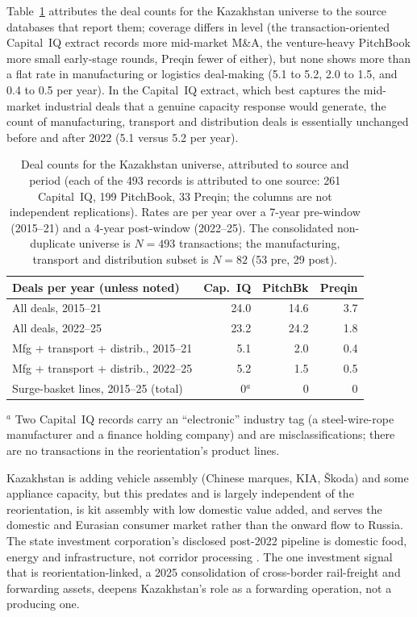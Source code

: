 \documentclass[12pt]{article}
\begin{document}
Table~\ref{tab:dealsource} attributes the deal counts for the Kazakhstan universe to the source databases that report them; coverage differs in level (the
transaction-oriented Capital~IQ extract records more mid-market M\&A, the venture-heavy
PitchBook more small early-stage rounds, Preqin fewer of either), but none shows more than a
flat rate in manufacturing or logistics deal-making (5.1 to 5.2, 2.0 to 1.5, and 0.4 to 0.5
per year). In the Capital~IQ extract, which best
captures the mid-market industrial deals that a genuine capacity response would generate, the
count of manufacturing, transport and distribution deals is essentially unchanged before and
after 2022 (5.1 versus 5.2 per year).

\begin{table}[t]
\centering
\caption{Deal counts for the Kazakhstan universe, attributed to source and period (each of the 493 records is attributed to one source: 261 Capital~IQ, 199 PitchBook, 33 Preqin; the columns are not independent replications). Rates are per year
over a 7-year pre-window (2015--21) and a 4-year post-window (2022--25). The consolidated
non-duplicate universe is $N = 493$ transactions; the manufacturing, transport and
distribution subset is $N = 82$ (53 pre, 29 post).}
\label{tab:dealsource}
\footnotesize
\begin{tabular}{lrrr}
\toprule
Deals per year (unless noted) & Cap.~IQ & PitchBk & Preqin \\
\midrule
All deals, 2015--21              & 24.0 & 14.6 & 3.7 \\
All deals, 2022--25              & 23.2 & 24.2 & 1.8 \\
Mfg + transport + distrib., 2015--21 & 5.1 & 2.0 & 0.4 \\
Mfg + transport + distrib., 2022--25 & 5.2 & 1.5 & 0.5 \\
Surge-basket lines, 2015--25 (total) & 0$^{a}$ & 0 & 0 \\
\bottomrule
\end{tabular}

\vspace{2pt}
\footnotesize $^{a}$ Two Capital~IQ records carry an ``electronic'' industry tag (a
steel-wire-rope manufacturer and a finance holding company) and are misclassifications; there
are no transactions in the reorientation's product lines.
\end{table}

Kazakhstan is adding vehicle assembly (Chinese marques, KIA, \v{S}koda) and some appliance
capacity, but this predates and is largely independent of the reorientation, is kit assembly
with low domestic value added, and serves the domestic and Eurasian consumer market rather
than the onward flow to Russia. The state investment corporation's disclosed
post-2022 pipeline is domestic food, energy and infrastructure, not corridor processing
\citep{qicaifcifc2026pe}. The one
investment signal that is reorientation-linked, a 2025 consolidation of cross-border
rail-freight and forwarding assets, deepens Kazakhstan's role as a forwarding operation, not
a producing one.
\end{document}
